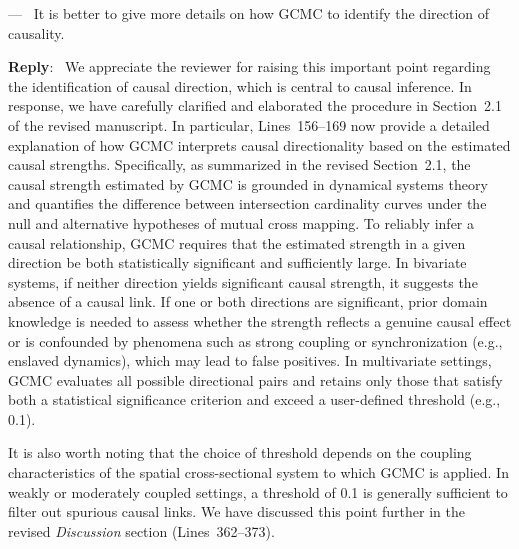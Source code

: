 \documentclass[11pt]{article}
\newcounter{reviewer}
\newcounter{point}[reviewer]
\renewcommand{\thepoint}{Comment\,\thereviewer.\arabic{point}}
\newenvironment{point}
   {\refstepcounter{point} \bigskip \noindent {\textbf{Reviewer~\thepoint} } ---\ }
   {\par }
\newenvironment{reply}
   {\medskip \noindent \color{blue} \begin{sf}\textbf{Reply}:\  }
   {\medskip \par \end{sf}}
\begin{document}
\begin{point}
It is better to give more details on how GCMC to identify the direction of causality.
\end{point}
\begin{reply}
We appreciate the reviewer for raising this important point regarding the identification of causal direction, which is central to causal inference. In response, we have carefully clarified and elaborated the procedure in Section~2.1 of the revised manuscript. In particular, Lines~156--169 now provide a detailed explanation of how GCMC interprets causal directionality based on the estimated causal strengths. Specifically, as summarized in the revised Section~2.1, the causal strength estimated by GCMC is grounded in dynamical systems theory and quantifies the difference between intersection cardinality curves under the null and alternative hypotheses of mutual cross mapping. To reliably infer a causal relationship, GCMC requires that the estimated strength in a given direction be both statistically significant and sufficiently large. In bivariate systems, if neither direction yields significant causal strength, it suggests the absence of a causal link. If one or both directions are significant, prior domain knowledge is needed to assess whether the strength reflects a genuine causal effect or is confounded by phenomena such as strong coupling or synchronization (e.g., enslaved dynamics), which may lead to false positives. In multivariate settings, GCMC evaluates all possible directional pairs and retains only those that satisfy both a statistical significance criterion and exceed a user-defined threshold (e.g., 0.1).

It is also worth noting that the choice of threshold depends on the coupling characteristics of the spatial cross-sectional system to which GCMC is applied. In weakly or moderately coupled settings, a threshold of 0.1 is generally sufficient to filter out spurious causal links. We have discussed this point further in the revised \textit{Discussion} section (Lines~362--373).
\end{reply}


\baselineskip12pt
 
 
\end{document}
